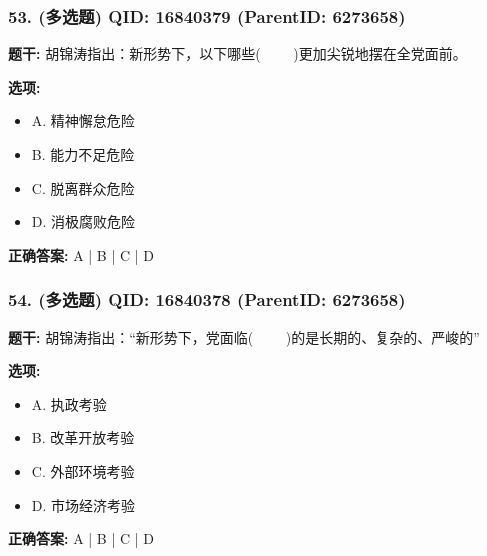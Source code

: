 \documentclass[12pt,UTF8]{ctexart}
\begin{document}
\subsubsection*{53. (多选题) \small QID: 16840379 (ParentID: 6273658)}

\textbf{题干:}
胡锦涛指出：新形势下，以下哪些(     )更加尖锐地摆在全党面前。



\textbf{选项:}
\begin{itemize}[leftmargin=*]

  \item A. 精神懈怠危险

  \item B. 能力不足危险

  \item C. 脱离群众危险

  \item D. 消极腐败危险

\end{itemize}

\textbf{正确答案:}
A | B | C | D

\vspace{0.3em}\hrulefill\vspace{0.7em}

\subsubsection*{54. (多选题) \small QID: 16840378 (ParentID: 6273658)}

\textbf{题干:}
胡锦涛指出：“新形势下，党面临(     )的是长期的、复杂的、严峻的”



\textbf{选项:}
\begin{itemize}[leftmargin=*]

  \item A. 执政考验

  \item B. 改革开放考验

  \item C. 外部环境考验

  \item D. 市场经济考验

\end{itemize}

\textbf{正确答案:}
A | B | C | D

\vspace{0.3em}\hrulefill\vspace{0.7em}
\end{document}
